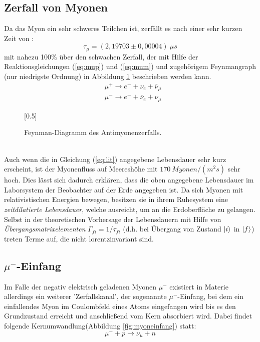 	\subsection{Zerfall von Myonen}
	Da das Myon ein sehr schweres Teilchen ist, zerfällt es nach einer sehr kurzen Zeit von \cite{PA}:\\
		\begin{equation} \label{eq:lit}
			\tau_\mu = (2,19703 \pm 0,00004)\ \unit{\mu s}
		\end{equation}
	mit nahezu 100\% über den schwachen Zerfall, der mit Hilfe der Reaktionsgleichungen (\ref{eq:mup}) und (\ref{eq:mum}) und zugehörigem Feynmangraph (nur niedrigste Ordnung) in Abbildung \ref{fig:myonzerfall} beschrieben werden kann.\\
	
		\begin{align}
			&\mu^+ \longrightarrow e^+ + \nu_e + \bar{\nu}_\mu 		\label{eq:mup}\\
			&\mu^- \longrightarrow e^- + \bar{\nu}_e + \nu_\mu 		\label{eq:mum}
		\end{align}
		\begin{figure}[hp]
            \centering
            \scalebox{0.5}[0.5]{
  			
            }
            \caption{Feynman-Diagramm des Antimyonenzerfalls.}
            \label{fig:myonzerfall}
        \end{figure}
	\ \\
	Auch wenn die in Gleichung (\ref{eq:lit}) angegebene Lebensdauer sehr kurz erscheint, ist der Myonenfluss auf Meereshöhe mit $170\ \unit{Myonen/(m^2s)}$ sehr hoch. Dies lässt sich dadurch erklären, dass die oben angegebene Lebensdauer im Laborsystem der Beobachter auf der Erde angegeben ist. Da sich Myonen mit relativistischen Energien bewegen, besitzen sie in ihrem Ruhesystem eine \textit{zeitdilatierte Lebensdauer}, welche ausreicht, um an die Erdoberfläche zu gelangen. Selbst in der theoretischen Vorhersage der Lebensdauern mit Hilfe von \textit{Übergangsmatrixelementen} $\Gamma_{fi} = 1/\tau_{fi}$ (d.h. bei Übergang von Zustand $\ket{i}$ in $\ket{f}$) treten Terme auf, die nicht lorentzinvariant sind.
	
	\subsection{$\mu^-$-Einfang}
	Im Falle der negativ elektrisch geladenen Myonen $\mu^-$ existiert in Materie allerdings ein weiterer 'Zerfallskanal', der sogenannte $\mu^-$-Einfang, bei dem ein einfallendes Myon im Coulombfeld eines Atoms eingefangen wird bis es den Grundzustand erreicht und anschließend vom Kern absorbiert wird. Dabei findet folgende Kernumwandlung(Abbildung \ref{fig:myoneinfang}) statt:
		\begin{equation*}
			\mu^- + p \longrightarrow  \nu_\mu + n 
		\end{equation*}
		
